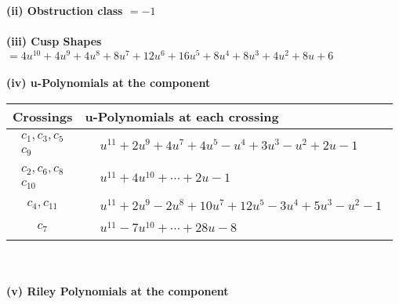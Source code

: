 \documentclass[1p]{elsarticle_modified}
\theoremstyle{definition}
\begin{document}
\flushleft \textbf{(ii) Obstruction class $= -1$}\\~\\
\flushleft \textbf{(iii) Cusp Shapes $= 4 u^{10}+4 u^9+4 u^8+8 u^7+12 u^6+16 u^5+8 u^4+8 u^3+4 u^2+8 u+6$}\\~\\
\newpage\renewcommand{\arraystretch}{1}
\flushleft \textbf{(iv) u-Polynomials at the component}\newline \\
\begin{tabular}{m{50pt}|m{274pt}}
Crossings & \hspace{64pt}u-Polynomials at each crossing \\
\hline $$\begin{aligned}c_{1},c_{3},c_{5}\\c_{9}\end{aligned}$$&$\begin{aligned}
&u^{11}+2 u^9+4 u^7+4 u^5- u^4+3 u^3- u^2+2 u-1
\end{aligned}$\\
\hline $$\begin{aligned}c_{2},c_{6},c_{8}\\c_{10}\end{aligned}$$&$\begin{aligned}
&u^{11}+4 u^{10}+\cdots+2 u-1
\end{aligned}$\\
\hline $$\begin{aligned}c_{4},c_{11}\end{aligned}$$&$\begin{aligned}
&u^{11}+2 u^9-2 u^8+10 u^7+12 u^5-3 u^4+5 u^3- u^2-1
\end{aligned}$\\
\hline $$\begin{aligned}c_{7}\end{aligned}$$&$\begin{aligned}
&u^{11}-7 u^{10}+\cdots+28 u-8
\end{aligned}$\\
\hline
\end{tabular}\\~\\
\newpage\renewcommand{\arraystretch}{1}
\flushleft \textbf{(v) Riley Polynomials at the component}\newline \\
\end{document}

